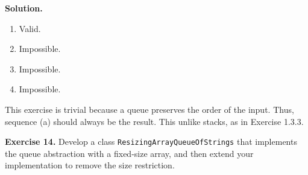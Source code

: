 \documentclass[12pt, a4paper]{article}
\newenvironment{ex}[2][Exercise]
{\par\medskip\noindent \textbf{#1 #2.}}
{\medskip}
\newenvironment{sol}[1][Solution]
{\par\medskip\noindent \textbf{#1.} }
{\medskip}
\begin{document}
	\begin{sol}
		\begin{enumerate}[label=(\alph*)]
			\item Valid.
			\item Impossible.
			\item Impossible.
			\item Impossible.
		\end{enumerate}
		This exercise is trivial because a queue preserves the order of the input.
		Thus, sequence (a) should always be the result. This unlike stacks, as in Exercise 1.3.3.
	\end{sol}
	\begin{ex}{14}
		Develop a class \texttt{ResizingArrayQueueOfStrings} that implements the queue abstraction
		with a fixed-size array, and then extend your implementation to remove the size restriction.
	\end{ex}
	\pagebreak
	\printbibliography
\end{document}
